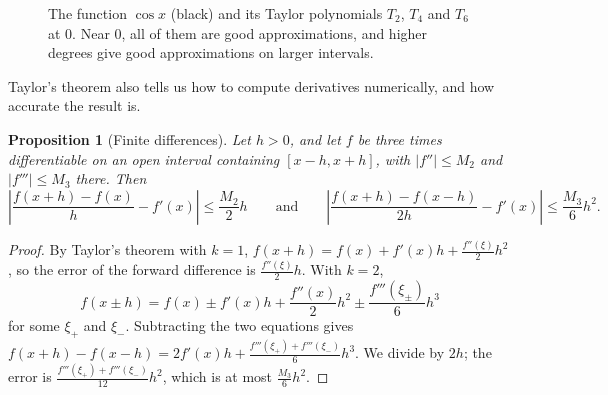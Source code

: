 \documentclass[11pt]{article}
\theoremstyle{definition}
\theoremstyle{plain}
\newtheorem{proposition}[definition]{Proposition}
\theoremstyle{remark}
\begin{document}
\begin{figure}[ht]
    \centering
    \caption{The function $\cos x$ (black) and its Taylor polynomials $T_2$, $T_4$ and $T_6$ at $0$. Near $0$, all of them are good approximations, and higher degrees give good approximations on larger intervals.}
    \label{fig:taylor-cos}
\end{figure}

Taylor's theorem also tells us how to compute derivatives numerically, and how accurate the result is.

\begin{proposition}[Finite differences]\label{prop:finite-differences}
    Let $h > 0$, and let $f$ be three times differentiable on an open interval containing $[x - h, x + h]$, with $|f''| \leq M_2$ and $|f'''| \leq M_3$ there. Then
    \[\left| \frac{f(x + h) - f(x)}{h} - f'(x) \right| \leq \frac{M_2}{2} h \qquad \text{and} \qquad \left| \frac{f(x + h) - f(x - h)}{2h} - f'(x) \right| \leq \frac{M_3}{6} h^2.\]
\end{proposition}

\begin{proof}
    By Taylor's theorem with $k = 1$, $f(x + h) = f(x) + f'(x) h + \frac{f''(\xi)}{2} h^2$, so the error of the forward difference is $\frac{f''(\xi)}{2} h$. With $k = 2$,
    \[f(x \pm h) = f(x) \pm f'(x) h + \frac{f''(x)}{2} h^2 \pm \frac{f'''(\xi_\pm)}{6} h^3\]
    for some $\xi_+$ and $\xi_-$. Subtracting the two equations gives $f(x + h) - f(x - h) = 2 f'(x) h + \frac{f'''(\xi_+) + f'''(\xi_-)}{6} h^3$. We divide by $2h$; the error is $\frac{f'''(\xi_+) + f'''(\xi_-)}{12} h^2$, which is at most $\frac{M_3}{6} h^2$.
\end{proof}
\end{document}
